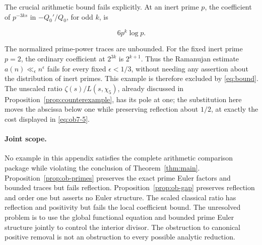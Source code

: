 The crucial arithmetic bound fails explicitly. At an inert prime \(p\), the coefficient of \(p^{-3ks}\) in \(-Q_0'/Q_0\), for odd \(k\), is

\begin{equation}\label{eq:ob7-5}
6p^k\log p.
\end{equation}

The normalized prime-power traces are unbounded. For the fixed inert prime \(p=2\), the ordinary coefficient at \(2^{3k}\) is \(2^{k+1}\). Thus the Ramanujan estimate \(a(n)\ll_\epsilon n^\epsilon\) fails for every fixed \(\epsilon<1/3\), without needing any assertion about the distribution of inert primes. This example is therefore excluded by \eqref{eq:bound}. The unscaled ratio \(\zeta(s)/L(s,\chi_5)\), already discussed in Proposition~\ref{prop:counterexample}, has its pole at one; the substitution here moves the abscissa below one while preserving reflection about \(1/2\), at exactly the cost displayed in \eqref{eq:ob7-5}.

\paragraph{Joint scope.}
No example in this appendix satisfies the complete arithmetic comparison package while violating the conclusion of Theorem~\ref{thm:main}. Proposition~\ref{prop:ob-primes} preserves the exact prime Euler factors and bounded traces but fails reflection. Proposition~\ref{prop:ob-gap} preserves reflection and order one but asserts no Euler structure. The scaled classical ratio has reflection and positivity but fails the local coefficient bound. The unresolved problem is to use the global functional equation and bounded prime Euler structure jointly to control the interior divisor. The obstruction to canonical positive removal is not an obstruction to every possible analytic reduction.
